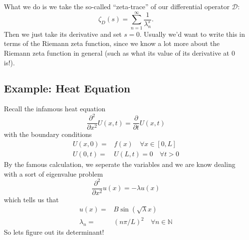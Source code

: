 What we do is we take the so-called ``zeta-trace'' of our differential operator $\mathcal{D}$:
\begin{equation}
\zeta_{D}(s) =\sum^{\infty}_{n=1}\frac{1}{\lambda_{n}^{s}}.
\end{equation}
Then we just take its derivative and set $s=0$. Usually we'd want to write this in terms of the Riemann zeta function, since we know a lot more about the Riemann zeta function in general (such as what its value of its derivative at 0 is!). 

\subsection{Example: Heat Equation}

Recall the infamous heat equation
\begin{equation}
\frac{\partial^{2}}{\partial x^{2}}U(x,t) = \frac{\partial}{\partial t}U(x,t)
\end{equation}
with the boundary conditions
\begin{equation}
\begin{split}
U(x,0)=&f(x)\quad\forall x\in[0,L]\\
U(0,t)=&U(L,t)=0\quad\forall t>0
\end{split}
\end{equation}
By the famous calculation, we seperate the variables and we are know dealing with a sort of eigenvalue problem
\begin{equation}
\frac{\partial^{2}}{\partial x^{2}}u(x) = -\lambda u(x)
\end{equation}
which tells us that
\begin{equation}
\begin{split}
u(x)  = & B\sin{(\sqrt{\lambda}x)}  \\
\lambda_{n}  = & (n\pi/L)^2 \quad \forall n\in\mathbb{N}
\end{split}
\end{equation}
So lets figure out its determinant!

